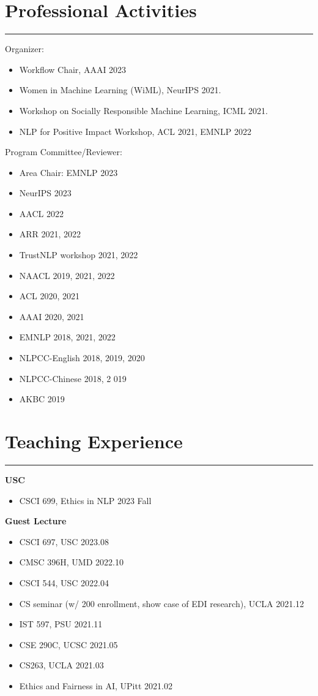 \documentclass[11pt, a4paper]{article}
\newcommand{\hr}{\hrule\vspace{0.5em}}
\begin{document}
\section*{Professional Activities}
\hr
Organizer:
\begin{itemize}
\item Workflow Chair, AAAI 2023
\item Women in Machine Learning (WiML), NeurIPS 2021. 
\item Workshop on Socially Responsible Machine Learning, ICML 2021.
\item NLP for Positive Impact Workshop, ACL 2021, EMNLP 2022
\end{itemize}
Program Committee/Reviewer:
\begin{itemize}
\item Area Chair: EMNLP 2023
\item NeurIPS 2023
\item AACL 2022
\item ARR 2021, 2022
\item TrustNLP workshop 2021, 2022
\item NAACL 2019, 2021, 2022
\item ACL 2020, 2021
\item AAAI 2020, 2021
\item EMNLP 2018,  2021, 2022
\item NLPCC-English 2018, 2019, 2020
\item NLPCC-Chinese 2018, 2 019
\item AKBC 2019
\end{itemize}

\section*{Teaching Experience}
\hr

\textbf{USC}
\begin{itemize}
\item CSCI 699, Ethics in NLP \hfill 2023 Fall
\end{itemize}

\textbf{Guest Lecture}
\begin{itemize}
\item CSCI 697, USC \hfill 2023.08
\item CMSC 396H, UMD \hfill 2022.10
\item CSCI 544, USC \hfill 2022.04
\item CS seminar (w/ 200 enrollment, show case of EDI research), UCLA \hfill 2021.12
\item IST 597, PSU \hfill  2021.11
\item CSE 290C, UCSC \hfill  2021.05
\item CS263, UCLA \hfill  2021.03
\item Ethics and Fairness in AI, UPitt \hfill  2021.02
\end{itemize}
\end{document}
